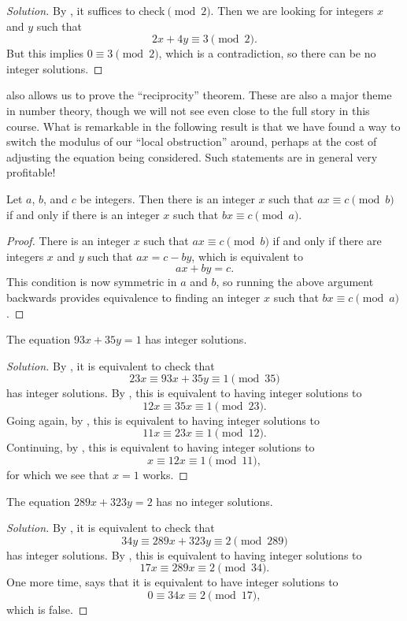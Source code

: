 \documentclass[../notes.tex]{subfiles}
\begin{document}
\begin{proof}[Solution]
	By , it suffices to check$\pmod2$. Then we are looking for integers $x$ and $y$ such that
	\[2x+4y\equiv3\pmod2.\]
	But this implies $0\equiv3\pmod2$, which is a contradiction, so there can be no integer solutions.
\end{proof}
 also allows us to prove the ``reciprocity'' theorem. These are also a major theme in number theory, though we will not see even close to the full story in this course. What is remarkable in the following result is that we have found a way to switch the modulus of our ``local obstruction'' around, perhaps at the cost of adjusting the equation being considered. Such statements are in general very profitable!
\begin{proposition} \label{prop:linear-recip}
	Let $a$, $b$, and $c$ be integers. Then there is an integer $x$ such that $ax\equiv c\pmod b$ if and only if there is an integer $x$ such that $bx\equiv c\pmod a$.
\end{proposition}
\begin{proof}
	There is an integer $x$ such that $ax\equiv c\pmod b$ if and only if there are integers $x$ and $y$ such that $ax=c-by$, which is equivalent to
	\[ax+by=c.\]
	This condition is now symmetric in $a$ and $b$, so running the above argument backwards provides equivalence to finding an integer $x$ such that $bx\equiv c\pmod a$.
\end{proof}
\begin{example}
	The equation $93x+35y=1$ has integer solutions.
\end{example}
\begin{proof}[Solution]
	By , it is equivalent to check that
	\[23x\equiv93x+35y\equiv1\pmod{35}\]
	has integer solutions. By , this is equivalent to having integer solutions to
	\[12x\equiv35x\equiv1\pmod{23}.\]
	Going again, by , this is equivalent to having integer solutions to
	\[11x\equiv23x\equiv1\pmod{12}.\]
	Continuing, by , this is equivalent to having integer solutions to
	\[x\equiv12x\equiv1\pmod{11},\]
	for which we see that $x=1$ works.
\end{proof}
\begin{example}
	The equation $289x+323y=2$ has no integer solutions.
\end{example}
\begin{proof}[Solution]
	By , it is equivalent to check that
	\[34y\equiv289x+323y\equiv2\pmod{289}\]
	has integer solutions. By , this is equivalent to having integer solutions to
	\[17x\equiv289x\equiv2\pmod{34}.\]
	One more time,  says that it is equivalent to have integer solutions to
	\[0\equiv34x\equiv2\pmod{17},\]
	which is false.
\end{proof}
\end{document}
